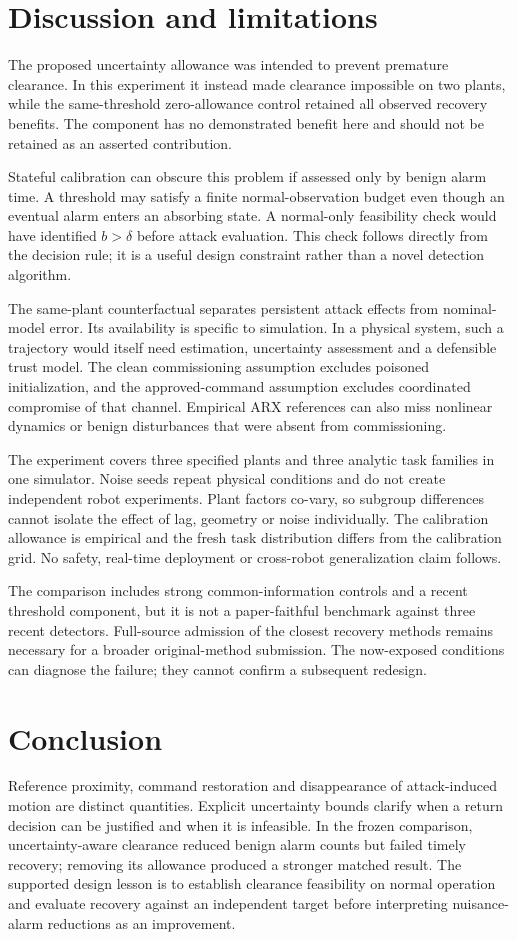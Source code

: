 \documentclass[11pt]{article}
\begin{document}
\section{Discussion and limitations}
The proposed uncertainty allowance was intended to prevent premature clearance. In this experiment it instead made clearance impossible on two plants, while the same-threshold zero-allowance control retained all observed recovery benefits. The component has no demonstrated benefit here and should not be retained as an asserted contribution.

Stateful calibration can obscure this problem if assessed only by benign alarm time. A threshold may satisfy a finite normal-observation budget even though an eventual alarm enters an absorbing state. A normal-only feasibility check would have identified $b>\delta$ before attack evaluation. This check follows directly from the decision rule; it is a useful design constraint rather than a novel detection algorithm.

The same-plant counterfactual separates persistent attack effects from nominal-model error. Its availability is specific to simulation. In a physical system, such a trajectory would itself need estimation, uncertainty assessment and a defensible trust model. The clean commissioning assumption excludes poisoned initialization, and the approved-command assumption excludes coordinated compromise of that channel. Empirical ARX references can also miss nonlinear dynamics or benign disturbances that were absent from commissioning.

The experiment covers three specified plants and three analytic task families in one simulator. Noise seeds repeat physical conditions and do not create independent robot experiments. Plant factors co-vary, so subgroup differences cannot isolate the effect of lag, geometry or noise individually. The calibration allowance is empirical and the fresh task distribution differs from the calibration grid. No safety, real-time deployment or cross-robot generalization claim follows.

The comparison includes strong common-information controls and a recent threshold component, but it is not a paper-faithful benchmark against three recent detectors. Full-source admission of the closest recovery methods remains necessary for a broader original-method submission. The now-exposed conditions can diagnose the failure; they cannot confirm a subsequent redesign.

\section{Conclusion}
Reference proximity, command restoration and disappearance of attack-induced motion are distinct quantities. Explicit uncertainty bounds clarify when a return decision can be justified and when it is infeasible. In the frozen comparison, uncertainty-aware clearance reduced benign alarm counts but failed timely recovery; removing its allowance produced a stronger matched result. The supported design lesson is to establish clearance feasibility on normal operation and evaluate recovery against an independent target before interpreting nuisance-alarm reductions as an improvement.
\end{document}
